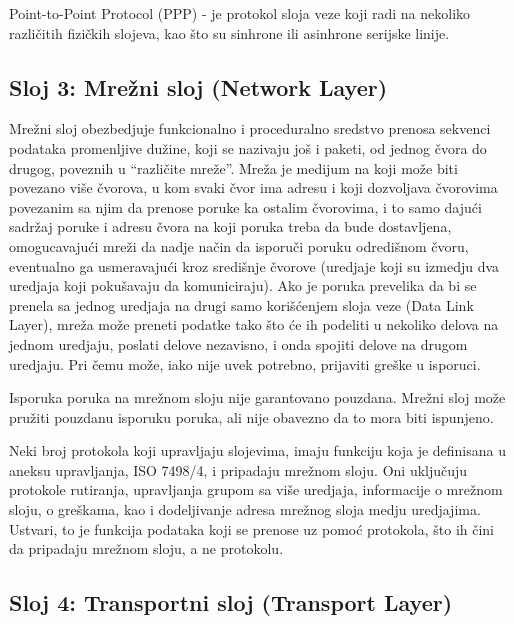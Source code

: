 \documentclass[a4paper,12pt, master]{etf}
\begin{document}
	Point-to-Point Protocol (PPP) - je protokol sloja veze koji radi na
	nekoliko razli\v{c}itih	fizi\v{c}kih slojeva, kao \v{s}to su sinhrone ili
	asinhrone serijske linije.

	\subsection{Sloj 3: Mre\v{z}ni sloj (Network Layer)}

	Mre\v{z}ni sloj obezbedjuje funkcionalno i proceduralno sredstvo prenosa
	sekvenci podataka promenljive du\v{z}ine, koji se nazivaju jo\v{s} i paketi,
	od jednog \v{c}vora do drugog, poveznih u ``razli\v{c}ite mre\v{z}e''.
	Mre\v{z}a je medijum na koji mo\v{z}e biti povezano vi\v{s}e \v{c}vorova, u
    kom svaki \v{c}vor ima adresu i koji dozvoljava \v{c}vorovima povezanim sa
    njim da prenose poruke ka ostalim \v{c}vorovima, i to samo daju\'{c}i
    sadr\v{z}aj poruke i adresu \v{c}vora na koji poruka treba da bude
    dostavljena, omogucavaju\'{c}i mre\v{z}i da nadje na\v{c}in da isporu\v{c}i
    poruku odredi\v{s}nom \v{c}voru, eventualno ga usmeravaju\'{c}i kroz
    sredi\v{s}nje \v{c}vorove (uredjaje koji su izmedju dva uredjaja koji
    poku\v{s}avaju da komuniciraju). Ako je poruka prevelika da bi se prenela sa
    jednog uredjaja na drugi samo kori\v{s}\'{c}enjem sloja veze (Data Link
    Layer), mre\v{z}a mo\v{z}e preneti podatke tako \v{s}to \'{c}e ih podeliti
    u nekoliko delova na jednom uredjaju, poslati delove nezavisno, i onda
    spojiti delove na drugom uredjaju. Pri \v{c}emu mo\v{z}e, iako nije uvek
    potrebno, prijaviti gre\v{s}ke u isporuci.

	Isporuka poruka na mre\v{z}nom sloju nije garantovano pouzdana. Mre\v{z}ni
	sloj mo\v{z}e pru\v{z}iti pouzdanu isporuku poruka, ali nije obavezno da to
	mora biti ispunjeno.

	Neki broj protokola koji upravljaju slojevima, imaju funkciju koja je
	definisana u aneksu	upravljanja, ISO 7498/4, i pripadaju mre\v{z}nom sloju.
	Oni uklju\v{c}uju protokole rutiranja, upravljanja grupom sa vi\v{s}e
	uredjaja, informacije o mre\v{z}nom sloju, o gre\v{s}kama, kao i
	dodeljivanje adresa mre\v{z}nog sloja medju uredjajima. Ustvari, to je
	funkcija podataka koji se prenose uz pomo\'{c} protokola, \v{s}to ih
	\v{c}ini da pripadaju mre\v{z}nom sloju, a ne protokolu.

	\subsection{Sloj 4: Transportni sloj (Transport Layer)}
\end{document}
